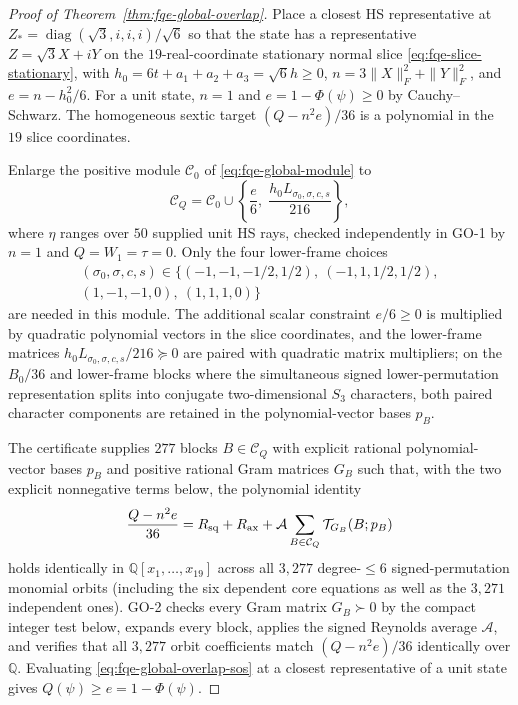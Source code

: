 \begin{proof}[Proof of Theorem~\ref{thm:fqe-global-overlap}]
Place a closest HS representative at
$Z_*=\operatorname{diag}(\sqrt3,i,i,i)/\sqrt6$ so that the state has a
representative $Z=\sqrt3X+iY$ on the $19$-real-coordinate stationary normal
slice \eqref{eq:fqe-slice-stationary},
with $h_0=6t+a_1+a_2+a_3=\sqrt6h\ge0$, $n=3\|X\|_F^2+\|Y\|_F^2$, and
$e=n-h_0^2/6$. For a unit state, $n=1$ and $e=1-\Phi(\psi)\ge0$ by
Cauchy--Schwarz. The homogeneous sextic target $(Q-n^2e)/36$ is a polynomial in the
$19$ slice coordinates.

Enlarge the positive module $\mathcal C_0$ of \eqref{eq:fqe-global-module} to
\begin{equation}\label{eq:fqe-global-overlap-module}
 \mathcal C_Q
 =\mathcal C_0\cup\left\{\frac{e}{6},\;\frac{h_0L_{\sigma_0,\sigma,c,s}}{216}\right\},
\end{equation}
where $\eta$ ranges over $50$ supplied unit HS rays, checked independently in GO-1 by
$n=1$ and $Q=W_1=\tau=0$. Only the four lower-frame choices
\[\begin{gathered}
 (\sigma_0,\sigma,c,s)\in\{(-1,-1,-1/2,1/2),\ (-1,1,1/2,1/2),\\
 (1,-1,-1,0),\ (1,1,1,0)\}
\end{gathered}\]
are needed in this module. The additional scalar constraint $e/6\ge0$ is
multiplied by quadratic polynomial vectors in the slice coordinates, and the
lower-frame matrices $h_0L_{\sigma_0,\sigma,c,s}/216\succeq0$ are paired with
quadratic matrix multipliers; on the $B_0/36$ and lower-frame blocks where the
simultaneous signed lower-permutation representation splits into conjugate
two-dimensional $S_3$ characters, both paired character components are
retained in the polynomial-vector bases $p_B$.

The certificate supplies $277$ blocks $B\in\mathcal C_Q$ with explicit rational
polynomial-vector bases $p_B$ and positive rational Gram matrices $G_B$ such
that, with the two explicit nonnegative terms below, the polynomial identity
\begin{equation}\label{eq:fqe-global-overlap-sos}
 \frac{Q-n^2e}{36}
 =R_{\rm sq}+R_{\rm ax}+\mathcal A\sum_{B\in\mathcal C_Q}\mathcal T_{G_B}(B;p_B)
\end{equation}
holds identically in $\mathbb Q[x_1,\dots,x_{19}]$ across all $3{,}277$
degree-$\le6$ signed-permutation monomial orbits (including the six dependent
core equations as well as the $3{,}271$ independent ones). GO-2 checks every
Gram matrix $G_B\succ0$ by the compact integer test below, expands every block, applies the signed Reynolds average
$\mathcal A$, and verifies that all $3{,}277$ orbit coefficients match
$(Q-n^2e)/36$ identically over $\mathbb Q$. Evaluating
\eqref{eq:fqe-global-overlap-sos} at a closest representative of a unit state
gives $Q(\psi)\ge e=1-\Phi(\psi)$.


\end{proof}
